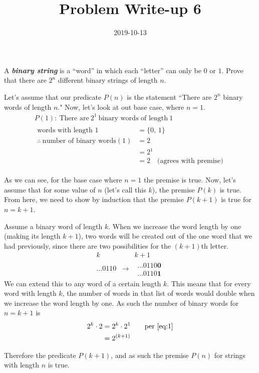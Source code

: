\documentclass[a4paper,12pt]{article}
\title{Problem Write-up 6}
\date{2019-10-13}
\begin{document}
    \begin{problem}
        A \textbf{\textit{binary string}} is a “word” in which each “letter” can only be \(0\) or \(1\). Prove that there are \(2^n\) different binary strings of length \(n\).
    \end{problem}
    \begin{answer}
        Let's assume that our predicate \(P(n)\) is the statement ``There are \(2^n\) binary words of length \(n\)." Now, let's look at out base case, where \(n = 1\).
        \begin{gather}
            \nonumber P(1): \ \text{There are} \ 2^1 \ \text{binary words of length} \ 1 \\
            \begin{split} \label{eq:1}
                \text{words with length 1} &= \{0, \, 1\} \\
                \therefore \ \text{number of binary words}(1) &= 2 \\
                &= 2^1 \\
                &= 2  \quad \text{(agrees with premise)}
            \end{split}
        \end{gather}

        As we can see, for the base case where \(n = 1\) the premise is true. Now, let's assume that for some value of \(n\) (let's call this \(k\)), the premise \(P(k)\) is true. From here, we need to show by induction that the premise \(P(k + 1)\) is true for \(n = k + 1\). 

        Assume a binary word of length \(k\). When we increase the word length by one (making its length \(k + 1\)), two words will be created out of the one word that we had previously, since there are two possibilities for the \((k + 1)\)th letter.
        \[
            \begin{array}{ccc}
                k & & k + 1 \\
                \ldots 0110 & \longrightarrow & \begin{aligned}
                    \ldots 0110\mathbf{0} \\
                    \ldots 0110\mathbf{1} 
                \end{aligned}
            \end{array}
        \]
        We can extend this to any word of a certain length \(k\). This means that for every word with length \(k\), the number of words in that list of words would double when we increase the word length by one. As such the number of binary words for \(n = k + 1\) is
        \begin{align}
            \notag 2^k \cdot 2 &= 2^k \cdot 2^1 \qquad \text{per \eqref{eq:1}} \\
            &= 2^{(k +1)}
        \end{align}
        
        Therefore the predicate \(P(k + 1)\), and as such the premise \(P(n)\) for strings with length \(n\) is true.
    \end{answer}
\end{document}
